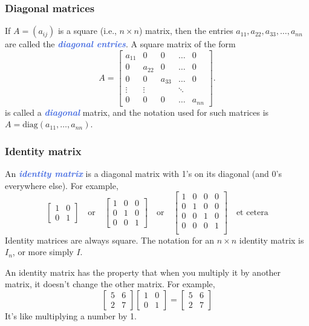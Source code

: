 \documentclass[10pt]{article}
\newcommand{\demph}[1]{\textcolor{RoyalBlue}{\textbf{\slshape #1}}} %
\theoremstyle{definition}
\newcommand{\diag}{\mathrm{diag}} %
\begin{document}
\subsubsection{Diagonal matrices}
If $A=(a_{ij})$ is a square (i.e., $n\times n$) matrix, then the entries
$a_{11},a_{22},a_{33},\ldots,a_{nn}$ are called the \demph{diagonal
  entries}. A square matrix of the form
\begin{equation*}
  A =\begin{bmatrix}
    a_{11}&0&0&\ldots& 0\\
    0&a_{22}&0&\ldots& 0\\
    0&0&a_{33}&\ldots& 0\\
    \vdots&\vdots & &\ddots \\
    0&0&0&\ldots& a_{nn}
  \end{bmatrix}.
\end{equation*}
is called a \demph{diagonal} matrix, and the notation used for such matrices
is $A=\diag(a_{11},\ldots,a_{nn})$.

\subsubsection{Identity matrix}
An \demph{identity matrix} is a diagonal matrix with 1's on its diagonal (and
0's everywhere else). For example,
\begin{equation*}
  \begin{bmatrix}
    1&0\\
    0&1
  \end{bmatrix}
  \quad \text{or} \quad
  \begin{bmatrix}
    1&0&0\\
    0&1&0\\
    0&0&1
  \end{bmatrix}
  \quad \text{or} \quad
  \begin{bmatrix}
    1&0&0&0\\
    0&1&0&0\\
    0&0&1&0\\
    0&0&0&1\\
  \end{bmatrix}
  \quad \text{et cetera}
\end{equation*}
Identity matrices are always square. The notation for an $n\times n$
identity matrix is $I_{n}$, or more simply $I$.

An identity matrix has the property that when you multiply it by another matrix, it doesn't
change the other matrix. For example,
\begin{equation*}
  \begin{bmatrix}
    5&6\\
    2&7
  \end{bmatrix}
  \begin{bmatrix}
    1&0\\
    0&1
  \end{bmatrix}
  =
  \begin{bmatrix}
    5&6\\
    2&7
  \end{bmatrix}
\end{equation*}
It's like multiplying a number by 1.
\end{document}
